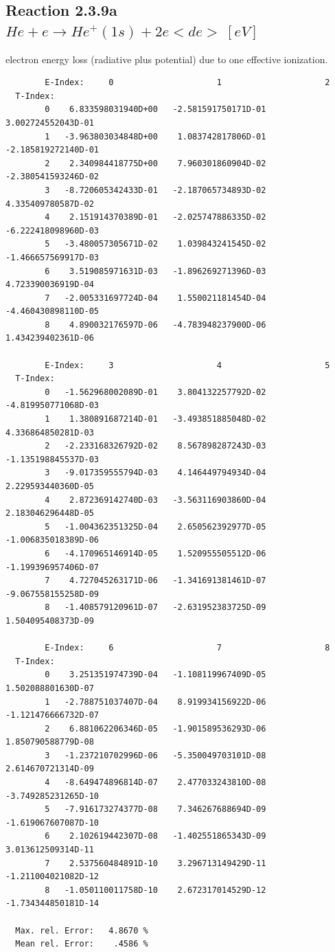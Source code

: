 \documentclass[12pt,dvips]{article}
\begin{document}
\subsection{
  Reaction 2.3.9a  $He + e \rightarrow He^+(1s) + 2e   <de> \ [eV] $
}

  electron energy loss (radiative plus potential) due to one effective ionization.

\begin{small}\begin{verbatim}
        E-Index:     0                     1                     2
  T-Index:
        0    6.833598031940D+00   -2.581591750171D-01    3.002724552043D-01
        1   -3.963803034848D+00    1.083742817806D-01   -2.185819272140D-01
        2    2.340984418775D+00    7.960301860904D-02   -2.380541593246D-02
        3   -8.720605342433D-01   -2.187065734893D-02    4.335409780587D-02
        4    2.151914370389D-01   -2.025747886335D-02   -6.222418098960D-03
        5   -3.480057305671D-02    1.039843241545D-02   -1.466657569917D-03
        6    3.519085971631D-03   -1.896269271396D-03    4.723390036919D-04
        7   -2.005331697724D-04    1.550021181454D-04   -4.460430898110D-05
        8    4.890032176597D-06   -4.783948237900D-06    1.434239402361D-06

        E-Index:     3                     4                     5
  T-Index:
        0   -1.562968002089D-01    3.804132257792D-02   -4.819950771068D-03
        1    1.380891687214D-01   -3.493851885048D-02    4.336864850281D-03
        2   -2.233168326792D-02    8.567898287243D-03   -1.135198845537D-03
        3   -9.017359555794D-03    4.146449794934D-04    2.229593440360D-05
        4    2.872369142740D-03   -3.563116903860D-04    2.183046296448D-05
        5   -1.004362351325D-04    2.650562392977D-05   -1.006835018389D-06
        6   -4.170965146914D-05    1.520955505512D-06   -1.199396957406D-07
        7    4.727045263171D-06   -1.341691381461D-07   -9.067558155258D-09
        8   -1.408579120961D-07   -2.631952383725D-09    1.504095408373D-09

        E-Index:     6                     7                     8
  T-Index:
        0    3.251351974739D-04   -1.108119967409D-05    1.502088801630D-07
        1   -2.788751037407D-04    8.919934156922D-06   -1.121476666732D-07
        2    6.881062206346D-05   -1.901589536293D-06    1.850790588779D-08
        3   -1.237210702996D-06   -5.350049703101D-08    2.614670721314D-09
        4   -8.649474896814D-07    2.477033243810D-08   -3.749285231265D-10
        5   -7.916173274377D-08    7.346267688694D-09   -1.619067607087D-10
        6    2.102619442307D-08   -1.402551865343D-09    3.013612509314D-11
        7    2.537560484891D-10    3.296713149429D-11   -1.211004021082D-12
        8   -1.050110011758D-10    2.672317014529D-12   -1.734344850181D-14

  Max. rel. Error:   4.8670 %
  Mean rel. Error:    .4586 %

\end{verbatim}\end{small}
\end{document}

